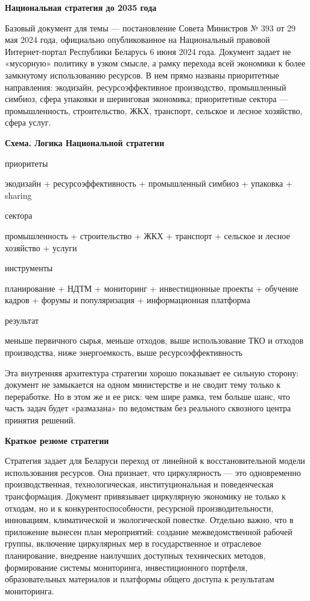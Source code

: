 \documentclass[14pt,a4paper]{extarticle}
\begin{document}
\textbf{Национальная стратегия до 2035 года}

Базовый документ для темы --- постановление Совета Министров № 393 от 29 мая 2024 года, официально опубликованное на Национальный правовой Интернет-портал Республики Беларусь 6 июня 2024 года. Документ задает не «мусорную» политику в узком смысле, а рамку перехода всей экономики к более замкнутому использованию ресурсов. В нем прямо названы приоритетные направления: экодизайн, ресурсоэффективное производство, промышленный симбиоз, сфера упаковки и шеринговая экономика; приоритетные сектора --- промышленность, строительство, ЖКХ, транспорт, сельское и лесное хозяйство, сфера услуг.

\textbf{Схема. Логика Национальной стратегии}

приоритеты

экодизайн + ресурсоэффективность + промышленный симбиоз + упаковка + sharing

сектора

промышленность + строительство + ЖКХ + транспорт + сельское и лесное хозяйство + услуги

инструменты

планирование + НДТМ + мониторинг + инвестиционные проекты + обучение кадров + форумы и популяризация + информационная платформа

результат

меньше первичного сырья, меньше отходов, выше использование ТКО и отходов производства, ниже энергоемкость, выше ресурсоэффективность

Эта внутренняя архитектура стратегии хорошо показывает ее сильную сторону: документ не замыкается на одном министерстве и не сводит тему только к переработке. Но в этом же и ее риск: чем шире рамка, тем больше шанс, что часть задач будет «размазана» по ведомствам без реального сквозного центра принятия решений.

\textbf{Краткое резюме стратегии}

Стратегия задает для Беларуси переход от линейной к восстановительной модели использования ресурсов. Она признает, что циркулярность --- это одновременно производственная, технологическая, институциональная и поведенческая трансформация. Документ привязывает циркулярную экономику не только к отходам, но и к конкурентоспособности, ресурсной производительности, инновациям, климатической и экологической повестке. Отдельно важно, что в приложение вынесен план мероприятий: создание межведомственной рабочей группы, включение циркулярных мер в государственное и отраслевое планирование, внедрение наилучших доступных технических методов, формирование системы мониторинга, инвестиционного портфеля, образовательных материалов и платформы общего доступа к результатам мониторинга.
\end{document}
